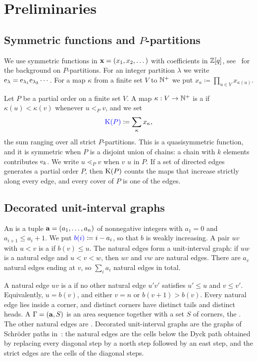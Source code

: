 \section{Preliminaries}\label{sec:preliminaries}

\subsection{Symmetric functions and \texorpdfstring{$P$}{P}-partitions}

We use symmetric functions in $\mathbf{x}=(x_1,x_2,\dotsc)$ with coefficients in
$\mathbb{Z}[q]$, see~\cite{Stanley1972} for the background on $P$-partitions.
For an integer partition $\lambda$ we write
$\mathrm{e}_\lambda=\mathrm{e}_{\lambda_1}\mathrm{e}_{\lambda_2}\dotsm$.
For a map $\kappa$ from a finite set $V$ to $\mathbb{N}^{+}$ we put
$x_\kappa\coloneqq\prod_{u\in V}x_{\kappa(u)}$.

Let $P$ be a partial order on a finite set $V$.
A map $\kappa:V\to\mathbb{N}^{+}$ is a  if
$\kappa(u)<\kappa(v)$ whenever $u<_P v$, and we set
\[
 \defin{\Kp(P)}\coloneqq\sum_{\kappa}x_\kappa,
\]
the sum ranging over all strict $P$-partitions.
This is a quasisymmetric function, and it is symmetric when $P$ is a disjoint
union of chains: a chain with $k$ elements contributes $\mathrm{e}_k$.
We write $u\lessdot_P v$ when $v$  $u$ in $P$.
If a set of directed edges generates a partial order $P$, then $\mathrm{K}(P)$ counts
the maps that increase strictly along every edge, and every cover of $P$ is one
of the edges.

\subsection{Decorated unit-interval graphs}

An  is a tuple $\mathbf{a}=(a_1,\dotsc,a_n)$ of nonnegative
integers with $a_1=0$ and $a_{i+1}\leq a_i+1$.
We put $\defin{b(i)}\coloneqq i-a_i$, so that $b$ is weakly increasing.
A pair $uv$ with $u<v$ is a  if $b(v)\leq u$.
The natural edges form a unit-interval graph: if $uw$ is a natural edge and
$u<v<w$, then $uv$ and $vw$ are natural edges.
There are $a_v$ natural edges ending at $v$, so $\sum_i a_i$ natural edges in
total.

A natural edge $uv$ is a  if no other natural edge $u'v'$
satisfies $u'\leq u$ and $v\leq v'$.
Equivalently, $u=b(v)$, and either $v=n$ or $b(v+1)>b(v)$.
Every natural edge lies inside a corner, and distinct corners have distinct
tails and distinct heads.
A  $\Gamma=(\mathbf{a},S)$ is an area sequence
together with a set $S$ of corners, the .
The other natural edges are .
Decorated unit-interval graphs are the graphs of Schröder paths
in~\cite[Sec.~2.6]{AlexanderssonSulzgruber2022}: the natural edges are the
cells below the Dyck path obtained by replacing every diagonal step by a north
step followed by an east step, and the strict edges are the cells of the
diagonal steps.

